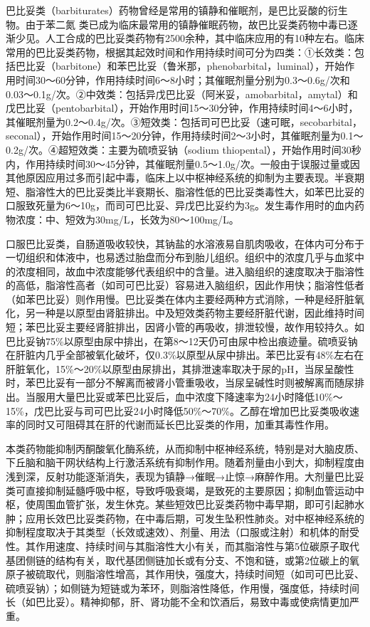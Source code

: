 巴比妥类（barbiturates）药物曾经是常用的镇静和催眠剂，是巴比妥酸的衍生物。由于苯二氮{}
类已成为临床最常用的镇静催眠药物，故巴比妥类药物中毒已逐渐少见。人工合成的巴比妥类药物有2500余种，其中临床应用的有10种左右。临床常用的巴比妥类药物，根据其起效时间和作用持续时间可分为四类：①长效类：包括巴比妥（barbitone）和苯巴比妥（鲁米那，phenobarbital，luminal），开始作用时间30～60分钟，作用持续时间6～8小时；其催眠剂量分别为0.3～0.6g/次和0.03～0.1g/次。②中效类：包括异戊巴比妥（阿米妥，amobarbital，amytal）和戊巴比妥（pentobarbital），开始作用时间15～30分钟，作用持续时间4～6小时，其催眠剂量为0.2～0.4g/次。③短效类：包括司可巴比妥（速可眠，secobarbital，seconal），开始作用时间15～20分钟，作用持续时间2～3小时，其催眠剂量为0.1～0.2g/次。④超短效类：主要为硫喷妥钠（sodium
thiopental），开始作用时间30秒内，作用持续时间30～45分钟，其催眠剂量0.5～1.0g/次。一般由于误服过量或因其他原因应用过多而引起中毒，临床上以中枢神经系统的抑制为主要表现。半衰期短、脂溶性大的巴比妥类比半衰期长、脂溶性低的巴比妥类毒性大，如苯巴比妥的口服致死量为6～10g，而司可巴比妥、异戊巴比妥约为3g。发生毒作用时的血内药物浓度：中、短效为30mg/L，长效为80～100mg/L。

口服巴比妥类，自肠道吸收较快，其钠盐的水溶液易自肌肉吸收，在体内可分布于一切组织和体液中，也易透过胎盘而分布到胎儿组织。组织中的浓度几乎与血浆中的浓度相同，故血中浓度能够代表组织中的含量。进入脑组织的速度取决于脂溶性的高低，脂溶性高者（如司可巴比妥）容易进入脑组织，因此作用快；脂溶性低者（如苯巴比妥）则作用慢。巴比妥类在体内主要经两种方式消除，一种是经肝脏氧化，另一种是以原型由肾脏排出。中及短效类药物主要经肝脏代谢，因此维持时间短；苯巴比妥主要经肾脏排出，因肾小管的再吸收，排泄较慢，故作用较持久。如巴比妥钠75\%以原型由尿中排出，在第8～12天仍可由尿中检出痕迹量。硫喷妥钠在肝脏内几乎全部被氧化破坏，仅0.3\%以原型从尿中排出。苯巴比妥有48\%左右在肝脏氧化，15\%～20\%以原型由尿排出，其排泄速率取决于尿的pH，当尿呈酸性时，苯巴比妥有一部分不解离而被肾小管重吸收，当尿呈碱性时则被解离而随尿排出。当服用大量巴比妥或苯巴比妥后，血中浓度下降速率为24小时降低10\%～15\%，戊巴比妥与司可巴比妥24小时降低50\%～70\%。乙醇在增加巴比妥类吸收速率的同时又可阻碍其在肝的代谢而延长巴比妥类的作用，加重其毒性作用。

本类药物能抑制丙酮酸氧化酶系统，从而抑制中枢神经系统，特别是对大脑皮质、下丘脑和脑干网状结构上行激活系统有抑制作用。随着剂量由小到大，抑制程度由浅到深，反射功能逐渐消失，表现为镇静→催眠→止惊→麻醉作用。大剂量巴比妥类可直接抑制延髓呼吸中枢，导致呼吸衰竭，是致死的主要原因；抑制血管运动中枢，使周围血管扩张，发生休克。某些短效巴比妥类药物中毒早期，即可引起肺水肿；应用长效巴比妥类药物，在中毒后期，可发生坠积性肺炎。对中枢神经系统的抑制程度取决于其类型（长效或速效）、剂量、用法（口服或注射）和机体的耐受性。其作用速度、持续时间与其脂溶性大小有关，而其脂溶性与第5位碳原子取代基团侧链的结构有关，取代基团侧链加长或有分支、不饱和链，或第2位碳上的氧原子被硫取代，则脂溶性增高，其作用快，强度大，持续时间短（如司可巴比妥、硫喷妥钠）；如侧链为短链或为苯环，则脂溶性降低，作用慢，强度低，持续时间长（如巴比妥）。精神抑郁，肝、肾功能不全和饮酒后，易致中毒或使病情更加严重。

